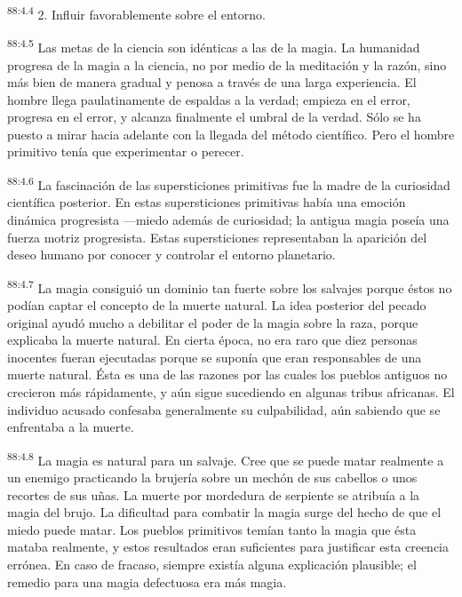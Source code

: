 \par
\textsuperscript{88:4.4} 2. Influir favorablemente sobre el entorno.

\par
\textsuperscript{88:4.5} Las metas de la ciencia son idénticas a las de la magia. La humanidad progresa de la magia a la ciencia, no por medio de la meditación y la razón, sino más bien de manera gradual y penosa a través de una larga experiencia. El hombre llega paulatinamente de espaldas a la verdad; empieza en el error, progresa en el error, y alcanza finalmente el umbral de la verdad. Sólo se ha puesto a mirar hacia adelante con la llegada del método científico. Pero el hombre primitivo tenía que experimentar o perecer.

\par
\textsuperscript{88:4.6} La fascinación de las supersticiones primitivas fue la madre de la curiosidad científica posterior. En estas supersticiones primitivas había una emoción dinámica progresista ---miedo además de curiosidad; la antigua magia poseía una fuerza motriz progresista. Estas supersticiones representaban la aparición del deseo humano por conocer y controlar el entorno planetario.

\par
\textsuperscript{88:4.7} La magia consiguió un dominio tan fuerte sobre los salvajes porque éstos no podían captar el concepto de la muerte natural. La idea posterior del pecado original ayudó mucho a debilitar el poder de la magia sobre la raza, porque explicaba la muerte natural. En cierta época, no era raro que diez personas inocentes fueran ejecutadas porque se suponía que eran responsables de una muerte natural. Ésta es una de las razones por las cuales los pueblos antiguos no crecieron más rápidamente, y aún sigue sucediendo en algunas tribus africanas. El individuo acusado confesaba generalmente su culpabilidad, aún sabiendo que se enfrentaba a la muerte.

\par
\textsuperscript{88:4.8} La magia es natural para un salvaje. Cree que se puede matar realmente a un enemigo practicando la brujería sobre un mechón de sus cabellos o unos recortes de sus uñas. La muerte por mordedura de serpiente se atribuía a la magia del brujo. La dificultad para combatir la magia surge del hecho de que el miedo puede matar. Los pueblos primitivos temían tanto la magia que ésta mataba realmente, y estos resultados eran suficientes para justificar esta creencia errónea. En caso de fracaso, siempre existía alguna explicación plausible; el remedio para una magia defectuosa era más magia.

